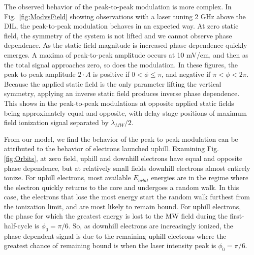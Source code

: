 \documentclass[aps,pra,preprint,groupedaddress]{revtex4-1}
\begin{document}
The observed behavior of the peak-to-peak modulation is more complex. In Fig.~\ref{fig:ModvsField} showing observations with a laser tuning 2 GHz above the DIL, the peak-to-peak modulation behaves in an expected way. At zero static field, the symmetry of the system is not lifted and we cannot observe phase dependence. As the static field magnitude is increased phase dependence quickly emerges. A maxima of peak-to-peak amplitude occurs at 10 mV/cm, and then as the total signal approaches zero, so does the modulation. In these figures, the peak to peak amplitude $2 \cdot A$ is positive if $0 < \phi \leq \pi$, and negative if $\pi < \phi < 2\pi$. Because the applied static field is the only parameter lifting the vertical symmetry, applying an inverse static field produces inverse phase dependence. This shows in the peak-to-peak modulations at opposite applied static fields being approximately equal and opposite, with delay stage positions of maximum field ionization signal separated by $\lambda_{MW} / 2$.

From our model, we find the behavior of the peak to peak modulation can be attributed to the behavior of electrons launched uphill.  Examining Fig. \ref{fig:Orbits}, at zero field, uphill and downhill electrons have equal and opposite phase dependence, but at relatively small fields downhill electrons almost entirely ionize. For uphill electrons, most available $E_{orbit}$ energies are in the regime where the electron quickly returns to the core and undergoes a random walk. In this case, the electrons that lose the most energy start the random walk furthest from the ionization limit, and are most likely to remain bound. For uphill electrons, the phase for which the greatest energy is lost to the MW field during the first-half-cycle is $\phi_0 = \pi/6$. So, as downhill electrons are increasingly ionized, the phase dependent signal is due to the remaining uphill electrons where the greatest chance of remaining bound is when the laser intensity peak is $\phi_0 = \pi/6$.
\end{document}
